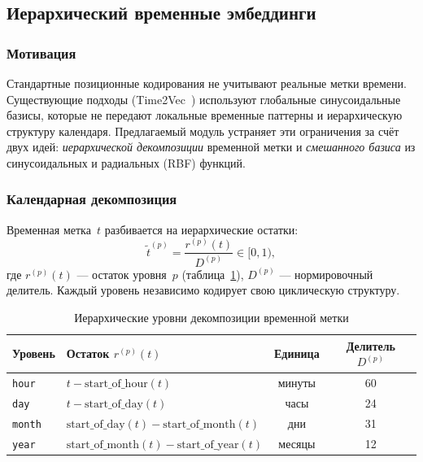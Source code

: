 \subsection{Иерархический временные эмбеддинги}
\label{sec:ch2:time_emb}

\subsubsection{Мотивация}

Стандартные позиционные кодирования не учитывают реальные метки времени. Существующие подходы
(Time2Vec~\cite{kazemi2020time2vec}) используют глобальные синусоидальные базисы, которые не
передают локальные временные паттерны и иерархическую структуру календаря. Предлагаемый модуль
устраняет эти ограничения за счёт двух идей: \emph{иерархической декомпозиции} временной метки и
\emph{смешанного базиса} из синусоидальных и радиальных (RBF) функций.

\subsubsection{Календарная декомпозиция}

Временная метка~$t$ разбивается на иерархические остатки:
\begin{equation}
  \tilde{t}^{(p)} = \frac{r^{(p)}(t)}{D^{(p)}} \in [0, 1),
\end{equation}
где $r^{(p)}(t)$ --- остаток уровня~$p$ (таблица~\ref{tab:time_decomp}), $D^{(p)}$ ---
нормировочный делитель. Каждый уровень независимо кодирует свою циклическую структуру.

\begin{table}[h]
\centering
\caption{Иерархические уровни декомпозиции временной метки}
\label{tab:time_decomp}
\begin{tabular}{llcc}
\hline
Уровень & Остаток $r^{(p)}(t)$ & Единица & Делитель $D^{(p)}$ \\
\hline
\texttt{hour}  & $t - \mathrm{start\_of\_hour}(t)$ & минуты   & 60  \\
\texttt{day}   & $t - \mathrm{start\_of\_day}(t)$  & часы     & 24  \\
\texttt{month} & $\mathrm{start\_of\_day}(t) - \mathrm{start\_of\_month}(t)$ & дни & 31 \\
\texttt{year}  & $\mathrm{start\_of\_month}(t) - \mathrm{start\_of\_year}(t)$ & месяцы & 12 \\
\hline
\end{tabular}
\end{table}

